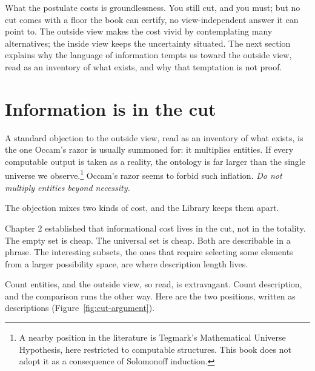 What the postulate costs is groundlessness. You still cut, and you must; but no cut comes with a floor the book can certify, no view-independent answer it can point to. The outside view makes the cost vivid by contemplating many alternatives; the inside view keeps the uncertainty situated. The next section explains why the language of information tempts us toward the outside view, read as an inventory of what exists, and why that temptation is not proof.

\section*{Information is in the cut}

A standard objection to the outside view, read as an inventory of what exists, is the one Occam's razor is usually summoned for: it multiplies entities. If every computable output is taken as a reality, the ontology is far larger than the single universe we observe.\footnote{A nearby position in the literature is Tegmark's Mathematical Universe Hypothesis, here restricted to computable structures. This book does not adopt it as a consequence of Solomonoff induction.} Occam's razor seems to forbid such inflation. \emph{Do not multiply entities beyond necessity.}

The objection mixes two kinds of cost, and the Library keeps them apart.

Chapter 2 established that informational cost lives in the cut, not in the totality. The empty set is cheap. The universal set is cheap. Both are describable in a phrase. The interesting subsets, the ones that require selecting some elements from a larger possibility space, are where description length lives.

Count entities, and the outside view, so read, is extravagant. Count description, and the comparison runs the other way. Here are the two positions, written as descriptions (Figure~\ref{fig:cut-argument}).

